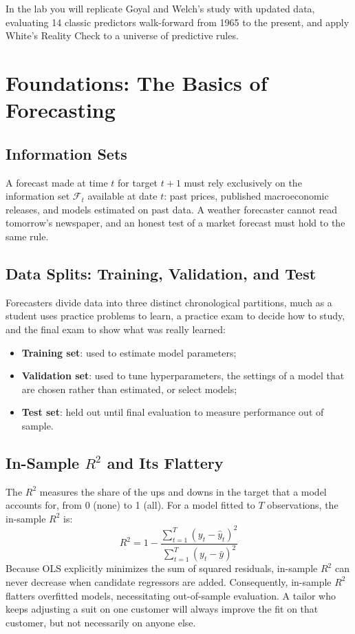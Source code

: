 In the lab you will replicate Goyal and Welch's study with updated data, evaluating 14 classic predictors walk-forward from 1965 to the present, and apply White's Reality Check to a universe of predictive rules.


\section{Foundations: The Basics of Forecasting}
\label{sec:09-foundations}

\subsection{Information Sets}
A forecast made at time $t$ for target $t+1$ must rely exclusively on the information set $\mathcal{F}_t$ available at date $t$: past prices, published macroeconomic releases, and models estimated on past data. A weather forecaster cannot read tomorrow's newspaper, and an honest test of a market forecast must hold to the same rule.

\subsection{Data Splits: Training, Validation, and Test}
Forecasters divide data into three distinct chronological partitions, much as a student uses practice problems to learn, a practice exam to decide how to study, and the final exam to show what was really learned:
\begin{itemize}
  \item \textbf{Training set}: used to estimate model parameters;
  \item \textbf{Validation set}: used to tune hyperparameters, the settings of a model that are chosen rather than estimated, or select models;
  \item \textbf{Test set}: held out until final evaluation to measure performance out of sample.
\end{itemize}

\subsection{In-Sample $R^2$ and Its Flattery}
The $R^2$ measures the share of the ups and downs in the target that a model accounts for, from 0 (none) to 1 (all). For a model fitted to $T$ observations, the in-sample $R^2$ is:
\begin{equation}
  R^2 = 1 - \frac{\sum_{t=1}^T (y_t - \hat{y}_t)^2}{\sum_{t=1}^T (y_t - \bar{y})^2}
  \label{eq:09-r2}
\end{equation}
Because OLS explicitly minimizes the sum of squared residuals, in-sample $R^2$ can never decrease when candidate regressors are added. Consequently, in-sample $R^2$ flatters overfitted models, necessitating out-of-sample evaluation. A tailor who keeps adjusting a suit on one customer will always improve the fit on that customer, but not necessarily on anyone else.


